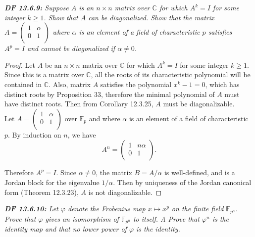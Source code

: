 \documentclass{article}
\begin{document}
\it \textbf{DF 13.6.9:} Suppose $A$ is an $n\times n$ matrix over
  $\mathbb{C}$ for which $A^k=I$ for some integer $k\geq1$. Show that $A$
  can be diagonalized. Show that the matrix $A=\begin{pmatrix} 1&\alpha\\
  0&1\\ \end{pmatrix}$ where $\alpha$ is an element of a field of
  characteristic $p$ satisfies $A^p=I$ and cannot be diagonalized if
  $\alpha\neq0$.

  \begin{proof}
    Let $A$ be an $n\times n$ matrix over $\mathbb{C}$ for which $A^k=I$
    for some integer $k\geq1$. Since this is a matrix over $\mathbb{C}$,
    all the roots of its characteristic polynomial will be contained in
    $\mathbb{C}$. Also, matrix $A$ satisfies the polynomial
    $x^k-1=0$, which has distinct roots by Proposition 33, therefore the
    minimal polynomial of $A$ must have distinct roots. Then from
    Corollary 12.3.25, $A$ must be diagonalizable. \\

    Let $A=\begin{pmatrix} 1&\alpha\\ 0&1\\ \end{pmatrix}$ over
    $\mathbb{F}_p$ and where $\alpha$ is an element of a field of
    characteristic $p$. By induction on $n$, we have
    \[A^n =\begin{pmatrix} 1&n\alpha\\ 0&1\\ \end{pmatrix}.\]

    Therefore $A^p=I$. Since $\alpha\neq0$, the matrix $B=A/\alpha$ is
    well-defined, and is a Jordan block for the eigenvalue $1/\alpha$.
    Then by uniqueness of the Jordan canonical form (Theorem 12.3.23),
    $A$ is not diagonalizable.
  \end{proof}

\it \textbf{DF 13.6.10:} Let $\varphi$ denote the Frobenius map $x\mapsto
  x^p$ on the finite field $\mathbb{F}_{p^n}$. Prove that $\varphi$ gives
  an isomorphism of $\mathbb{F}_{p^n}$ to itself. A Prove that $\varphi^n$
  is the identity map and that no lower power of $\varphi$ is the identity.
\end{document}
